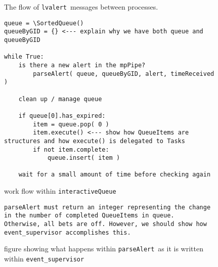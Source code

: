 \documentclass{article}
\newcommand{\alert}{\texttt{lvalert}~}
\newcommand{\interactiveQueue}{\texttt{interactiveQueue}~}
\newcommand{\parseAlert}{\texttt{parseAlert}~}
\newcommand{\SortedQueue}{\texttt{SortedQueue}~}
\newcommand{\eventSupervisor}{\texttt{event\_supervisor}~}
\begin{document}
\begin{figure}
    \caption{The flow of \alert messages between processes.}
    \label{fig: alert flow}
\end{figure}

\begin{figure}
\begin{verbatim}
queue = \SortedQueue()
queueByGID = {} <--- explain why we have both queue and queueByGID

while True:
    is there a new alert in the mpPipe?
        parseAlert( queue, queueByGID, alert, timeReceived )

    clean up / manage queue

    if queue[0].has_expired:
        item = queue.pop( 0 )
        item.execute() <--- show how QueueItems are structures and how execute() is delegated to Tasks
        if not item.complete:
            queue.insert( item )

    wait for a small amount of time before checking again
\end{verbatim}

    \caption{work flow within \interactiveQueue}
    \label{fig: interactiveQueue}
\end{figure}

\begin{figure}
\begin{verbatim}
parseAlert must return an integer representing the change in the number of completed QueueItems in queue.
Otherwise, all bets are off. However, we should show how event_supervisor accomplishes this.
\end{verbatim}
    \caption{figure showing what happens within \parseAlert as it is written within \eventSupervisor}
    \label{fig: parseAlert}
\end{figure}

\end{document}
